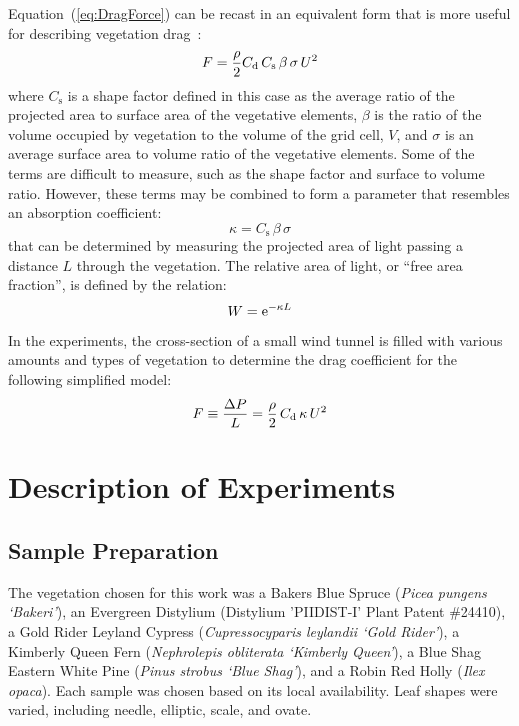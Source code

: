 \documentclass[12pt]{article}
\begin{document}
Equation~(\ref{eq:DragForce}) can be recast in an equivalent form that is more useful for describing vegetation drag~\cite{Mueller2014}:
\begin{equation}
\label{eq:DragForcea}
F  = \frac{\rho}{2} C_{\rm d} \, C_{\mathrm{s}} \, \beta \, \sigma \, U^2
\end{equation}
where $C_{\mathrm{s}}$ is a shape factor defined in this case as the average ratio of the projected area to surface area of the vegetative elements, $\beta$ is the ratio of the volume occupied by vegetation to the volume of the grid cell, $V$, and $\sigma$ is an average surface area to volume ratio of the vegetative elements. Some of the terms are difficult to measure, such as the shape factor and surface to volume ratio. However, these terms may be combined to form a parameter that resembles an absorption coefficient:
\begin{equation}
\label{eq:Kappa}
\kappa = C_{\mathrm{s}} \, \beta \, \sigma
\end{equation}
that can be determined by measuring the projected area of light passing a distance $L$ through the vegetation. The relative area of light, or ``free area fraction'', is defined by the relation:
\begin{equation}\label{eq:WhiteFraction}
W = {\rm e}^{-\kappa L}
\end{equation}
In the experiments, the cross-section of a small wind tunnel is filled with various amounts and types of vegetation to determine the drag coefficient for the following simplified model:
\begin{equation}\label{eq:Pressure}
F \equiv \frac{\Delta P}{L}  = \frac{\rho}{2} \, C_{\rm d} \, \kappa \, U^2
\end{equation}



\section{Description of Experiments}
\label{sec:Experiments}


\subsection{Sample Preparation}
\label{ssec:headingscap}

The vegetation chosen for this work was a Bakers Blue Spruce ({\em Picea pungens `Bakeri'}), an Evergreen Distylium (Distylium 'PIIDIST-I' Plant Patent \#24410), a Gold Rider Leyland Cypress ({\em Cupressocyparis leylandii `Gold Rider'}), a Kimberly Queen Fern ({\em Nephrolepis obliterata `Kimberly Queen'}), a Blue Shag Eastern White Pine ({\em Pinus strobus `Blue Shag'}), and a Robin Red Holly ({\em Ilex opaca}). Each sample was chosen based on its local availability. Leaf shapes were varied, including needle, elliptic, scale, and ovate.
\end{document}
